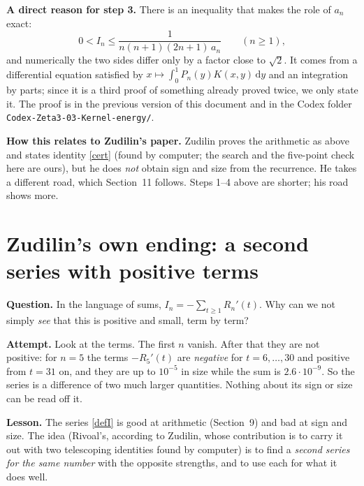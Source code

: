 \documentclass[11pt]{article}
\newcommand{\dd}{\,\mathrm d}
\theoremstyle{remark}
\newcommand{\q}[1]{\medskip\noindent\textbf{#1}}
\begin{document}
\q{A direct reason for step 3.} There is an inequality that makes the role of $a_n$ exact:
\[
0<I_n\le\frac1{n(n+1)(2n+1)\,a_n}\qquad(n\ge1),
\]
and numerically the two sides differ only by a factor close to $\sqrt2$. It comes from a
differential equation satisfied by $x\mapsto\int_0^1P_n(y)K(x,y)\dd y$ and an integration by parts;
since it is a third proof of something already proved twice, we only state it. The proof is in the
previous version of this document and in the Codex folder \texttt{Codex-Zeta3-03-Kernel-energy/}.

\q{How this relates to Zudilin's paper.} Zudilin proves the arithmetic as above and states
identity \eqref{cert} (found by computer; the search and the five-point check here are ours), but he does \emph{not} obtain sign and size from the recurrence. He takes a different
road, which Section~11 follows. Steps 1--4 above are shorter; his road shows more.

\section{Zudilin's own ending: a second series with positive terms}

\q{Question.} In the language of sums, $I_n=-\sum_{t\ge1}R_n'(t)$. Why can we not simply
\emph{see} that this is positive and small, term by term?

\q{Attempt.} Look at the terms. The first $n$ vanish. After that they are not positive: for $n=5$
the terms $-R_5'(t)$ are \emph{negative} for $t=6,\dots,30$ and positive from $t=31$ on, and they
are up to $10^{-5}$ in size while the sum is $2.6\cdot10^{-9}$. So the series is a difference of
two much larger quantities. Nothing about its sign or size can be read off it.

\q{Lesson.} The series \eqref{defI} is good at arithmetic (Section~9) and bad at sign and size.
The idea (Rivoal's, according to Zudilin, whose contribution is to carry it out with two
telescoping identities found by computer) is to find a \emph{second series for the same number}
with the opposite strengths, and to use each for what it does well.
\end{document}
